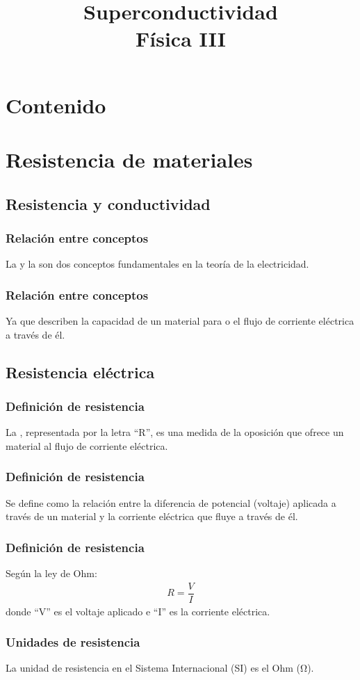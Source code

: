 \documentclass[14pt]{beamer}
\title{\Large{Superconductividad} \\ \normalsize{Física III}}
\date{}
\begin{document}
\maketitle

\section*{Contenido}

\section{Resistencia de materiales}
\subsection{Resistencia y conductividad}

\begin{frame}
\frametitle{Relación entre conceptos}
La  y la  son dos conceptos fundamentales en la teoría de la electricidad.
\end{frame}
\begin{frame}
\frametitle{Relación entre conceptos}
Ya que describen la capacidad de un material para  o  el flujo de corriente eléctrica a través de él.
\end{frame}

\subsection{Resistencia eléctrica}

\begin{frame}
\frametitle{Definición de resistencia}
La , representada por la letra \enquote{R}, \pause es una medida de la oposición que ofrece un material al flujo de corriente eléctrica.
\end{frame}
\begin{frame}
\frametitle{Definición de resistencia}
Se define como la relación entre la diferencia de potencial (voltaje) aplicada a través de un material y la corriente eléctrica que fluye a través de él.
\end{frame}
\begin{frame}
\frametitle{Definición de resistencia}
Según la ley de Ohm:
\pause
\begin{align*}
R = \dfrac{V}{I}
\end{align*}
donde \enquote{V} es el voltaje aplicado e \enquote{I} es la corriente eléctrica.
\end{frame}
\begin{frame}
\frametitle{Unidades de resistencia}
La unidad de resistencia en el Sistema Internacional (SI) es el Ohm (\unit{\ohm}).
\end{frame}
\end{document}
